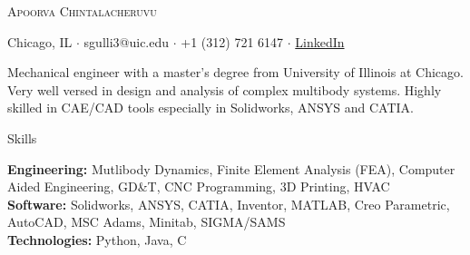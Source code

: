 \documentclass{resume}
\begin{document}
\vspace*{-40pt}

\vspace*{-10pt}
\begin{center}
	{\Huge \scshape {Apoorva Chintalacheruvu}}\\
	\end{center}
\begin{center}
	Chicago, IL $\cdot$ sgulli3@uic.edu $\cdot$ +1 (312) 721 6147 $\cdot$ \href{https://www.linkedin.com/in/sreevardhan-g-658175119/}{LinkedIn}
\end{center}
\vspace{3mm}

Mechanical engineer with a master’s degree from University of Illinois at Chicago. Very well versed in design and analysis of complex multibody systems. Highly skilled in CAE/CAD tools especially in Solidworks, ANSYS and CATIA.


\begin{rSection}{Skills}

\textbf{Engineering:} Mutlibody Dynamics, Finite Element Analysis (FEA), Computer Aided Engineering, GD\&T, CNC Programming, 3D Printing, HVAC
\\\textbf{Software:} Solidworks, ANSYS, CATIA, Inventor, MATLAB, Creo Parametric, AutoCAD, MSC Adams, Minitab, SIGMA/SAMS
\\\textbf{Technologies:} Python, Java, C
\end{rSection}



\end{document}
